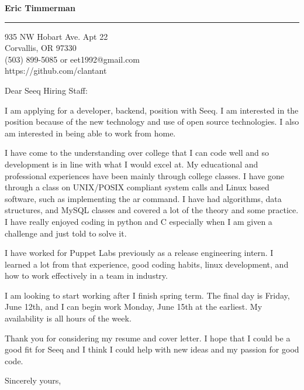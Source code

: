 \documentclass{letter} %
\begin{document}
\signature{Eric Timmerman}           %
\longindentation=0pt                       %
\let\raggedleft\raggedright                %
 
 
\begin{letter}

\begin{center}
{\large\bf Eric Timmerman} 
\end{center}
\medskip\hrule height 1pt
\begin{center}
{935 NW Hobart Ave. Apt 22 \\   Corvallis, OR 97330 \\ (503) 899-5085 or eet1992@gmail.com \\  https://github.com/clantant} 
\end{center}
 
Dear Seeq Hiring Staff:
 
\noindent I am applying for a developer, backend, position with Seeq. I am interested in the position because of the new technology and use of open source technologies. I also am interested in being able to work from home.
 
\noindent I have come to the understanding over college that I can code well and so development is in line with what I would excel at. My educational and professional experiences have been mainly through college classes. I have gone through a class on UNIX/POSIX compliant system calls and Linux based software, such as implementing the ar command. I have had algorithms, data structures, and MySQL classes and covered a lot of the theory and some practice. I have really enjoyed coding in python and C especially when I am given a challenge and just told to solve it.

\noindent I have worked for Puppet Labs previously as a release engineering intern. I learned a lot from that experience, good coding habits, linux development, and how to work effectively in a team in industry.

\noindent I am looking to start working after I finish spring term. The final day is Friday, June 12th, and I can begin work Monday, June 15th at the earliest. My availability is all hours of the week.

\noindent Thank you for considering my resume and cover letter. I hope that I could be a good fit for Seeq and I think I could help with new ideas and my passion for good code.
 
\closing{Sincerely yours,} 
 

 

\end{letter}
 
\end{document}

